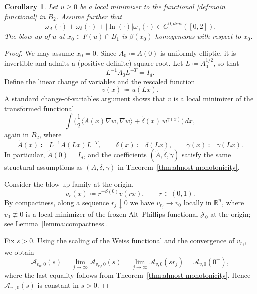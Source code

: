\documentclass[reqno,11pt]{amsart}
\newtheorem{corollary}{Corollary}[section]
\newcommand{\1}{\mathds{1}}  %
\numberwithin{equation}{section}
\begin{document}
\begin{corollary}
Let $u \geq 0$ be a local minimizer to the functional \eqref{def:main functional} in $B_2$. Assume further that
\[
	\omega_A(\cdot) + \omega_\delta(\cdot) + |\ln(\cdot)|\omega_\gamma(\cdot) \in C^{0,dini} ([0,2]).
\]
The blow-up of $u$ at $x_0 \in F(u)\cap B_{1}$ is $\beta(x_0)$-homogeneous with respect to $x_0$.
\end{corollary}

\begin{proof}
We may assume $x_0=0$. Since $A_0\coloneqq A(0)$ is uniformly elliptic, it is invertible and admits a (positive definite) square root. Let $L\coloneqq A_0^{1/2}$, so that
\[
    L^{-1}A_0L^{-T}=I_d.
\]
Define the linear change of variables and the rescaled function
\[
    v(x)\coloneqq u(Lx).
\]
A standard change-of-variables argument shows that $v$ is a local minimizer of the transformed functional
\[
    \int \bigg(\frac12\langle \widetilde A(x)\nabla w,\nabla w\rangle+\widetilde\delta(x)\,w^{\widetilde\gamma(x)}\bigg)\,dx,
\]
again in $B_2$, where
\[
    \widetilde A(x)\coloneqq L^{-1}A(Lx)L^{-T},\qquad
    \widetilde\delta(x)\coloneqq \delta(Lx),\qquad
    \widetilde\gamma(x)\coloneqq \gamma(Lx).
\]
In particular, $\widetilde A(0)=I_d$, and the coefficients $(\widetilde A,\widetilde\delta,\widetilde\gamma)$ satisfy the same structural assumptions as $(A,\delta,\gamma)$ in Theorem~\ref{thm:almost-monotonicity}.

Consider the blow-up family at the origin,
\[
    v_r(x)\coloneqq r^{-\beta(0)}v(rx),
\qquad r\in(0,1).
\]
By compactness, along a sequence $r_j\downarrow 0$ we have $v_{r_j}\to v_0$ locally in $\mathbb{R}^n$, where
$v_0\not\equiv 0$ is a local minimizer of the frozen Alt--Phillips functional $\mathcal{J}_0$ at the origin; see Lemma~\ref{lemma:compactness}.

Fix $s>0$. Using the scaling of the Weiss functional and the convergence of $v_{r_j}$, we obtain
\[
    \mathcal{A}_{v_0,0}(s)
    =\lim_{j\to\infty}\mathcal{A}_{v_{r_j},0}(s)
    =\lim_{j\to\infty}\mathcal{A}_{v,0}(sr_j)
    =\mathcal{A}_{v,0}(0^+),
\]
where the last equality follows from Theorem~\ref{thm:almost-monotonicity}. Hence
$\mathcal{A}_{v_0,0}(s)$ is constant in $s>0$.


\end{proof}
\end{document}
